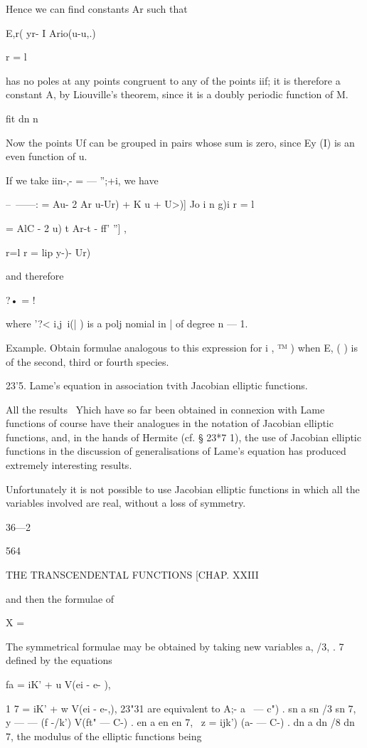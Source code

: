 {{{{{{{Hence we can find constants Ar such that

 E,r( yr- I Ario(u-u,.)

r = l

has no poles at any points congruent to any of the points iif; it is
therefore a constant A, by Liouville's theorem, since it is a doubly
periodic function of M.

fit dn n

Now the points Uf can be grouped in pairs whose sum is zero, since Ey
(I) is an even function of u.

If we take iin-,- = — '';+i, we have

--~——: = Au- 2 Ar u-Ur) + K u + U>)] Jo i n g)i r = l

= AlC - 2 u) t Ar-t - ff' ''] ,

r=l r = lip y-)- Ur)

and therefore

?• = !

where '?< i,j\ i(| ) is a polj nomial in | of degree n — 1.

Example. Obtain formulae analogous to this expression for i , ™ ) when
E, ( ) is of the second, third or fourth species.

23'5. Lame's equation in association tvith Jacobian elliptic
functions.

All the results \ Yhich have so far been obtained in connexion with
Lame functions of course have their analogues in the notation of
Jacobian elliptic functions, and, in the hands of Hermite (cf. § 23*7
1), the use of Jacobian elliptic functions in the discussion of
generalisations of Lame's equation has produced extremely interesting
results.

Unfortunately it is not possible to use Jacobian elliptic functions in
which all the variables involved are real, without a loss of symmetry.

36—2

564

THE TRANSCENDENTAL FUNCTIONS [CHAP. XXIII

and then the formulae of

X =

The symmetrical formulae may be obtained by taking new variables a,
/3, . 7 defined by the equations

fa = iK' + u V(ei - e- ),

1 7 = iK' + w V(ei - e-,), 23"31 are equivalent to A;- \/ a~ — c") .
sn a sn /3 sn 7, y — — (f -/k') V(ft" — C-) . en a en en 7, \ z =
ijk') \/(a- — C-) . dn a dn /8 dn 7, the modulus of the elliptic
functions being

}}}}}}}
